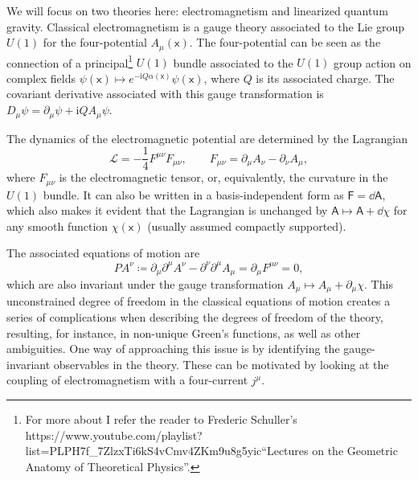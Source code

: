 \documentclass[letterpaper,12pt,titlepage,oneside,final]{book}
\newcommand{\href}[1]{#1} %
\newcommand{\mf}{\mathsf}%
\newcommand{\ii}{\mathrm{i}}
\begin{document}
We will focus on two theories here: electromagnetism and linearized quantum gravity. Classical electromagnetism is a gauge theory associated to the Lie group $U(1)$ for the four-potential $A_\mu(\mf x)$. The four-potential can be seen as the connection of a principal\footnote{For more about I refer the reader to Frederic Schuller's \href{https://www.youtube.com/playlist?list=PLPH7f_7ZlzxTi6kS4vCmv4ZKm9u8g5yic}{``Lectures on the Geometric Anatomy of Theoretical Physics''}.} $U(1)$ bundle associated to the $U(1)$ group action on complex fields $\psi(\mf x) \mapsto e^{-\ii Q \alpha(\mf x)} \psi(\mf x)$, where $Q$ is its associated charge. The covariant derivative associated with this gauge transformation is $D_\mu \psi = \partial_\mu \psi + \ii Q A_\mu \psi$. 

The dynamics of the electromagnetic potential are determined by the Lagrangian
\begin{equation}\label{eq:LagEM}
    \mathcal{L} = -\frac{1}{4}F^{\mu\nu}F_{\mu\nu}, \quad\quad F_{\mu\nu} = \partial_\mu A_\nu - \partial_\nu A_\mu,
\end{equation}
where $F_{\mu\nu}$ is the electromagnetic tensor, or, equivalently, the curvature in the $U(1)$ bundle. It can also be written in a basis-independent form as $\mf F = \dd \mf A$, which also makes it evident that the Lagrangian is unchanged by $\mf A \mapsto \mf A + \dd \chi$ for any smooth function $\chi(\mf x)$ (usually assumed compactly supported).

The associated equations of motion are
\begin{equation}
    PA^\nu \coloneqq \partial_\mu \partial^\mu A^\nu - \partial^\nu \partial^\mu A_\mu=\partial_\mu F^{\mu\nu} = 0,
\end{equation}
which are also invariant under the gauge transformation $A_\mu \mapsto A_\mu + \partial_\mu \chi$. This unconstrained degree of freedom in the classical equations of motion creates a series of complications when describing the degrees of freedom of the theory, resulting, for instance, in non-unique Green's functions, as well as other ambiguities. One way of approaching this issue is by identifying the gauge-invariant observables in the theory. These can be motivated by looking at the coupling of electromagnetism with a four-current $j^\mu$. 
\end{document}
